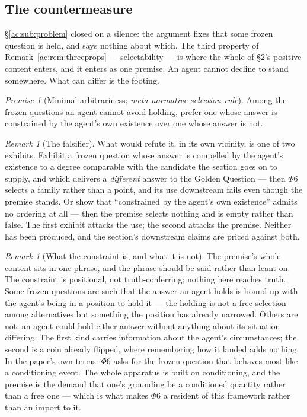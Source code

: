 \documentclass[11pt]{article}
\numberwithin{equation}{section}
\theoremstyle{plain}
\theoremstyle{definition}
\theoremstyle{remark}
\newtheorem{remark}[theorem]{Remark}
\newtheorem{premise}{Premise}
\begin{document}
\subsection{The countermeasure}\label{ac:sub:countermeasure}

\S\ref{ac:sub:problem} closed on a silence: the argument fixes that some frozen question is held, and says nothing about which. The third property of Remark~\ref{ac:rem:threeprops} --- selectability --- is where the whole of \S2's positive content enters, and it enters as one premise. An agent cannot decline to stand somewhere. What can differ is the footing.

\setcounter{premise}{5} %
\begin{premise}[Minimal arbitrariness; \emph{meta-normative selection rule}]\label{ac:phi6}
Among the frozen questions an agent cannot avoid holding, prefer one whose answer is constrained by the agent's own existence over one whose answer is not.
\end{premise}

\begin{remark}[The falsifier]\label{ac:rem:phi6falsifier}
What would refute it, in its own vicinity, is one of two exhibits. Exhibit a frozen question whose answer is compelled by the agent's existence to a degree comparable with the candidate the section goes on to supply, and which delivers a \emph{different} answer to the Golden Question --- then $\Phi6$ selects a family rather than a point, and its use downstream fails even though the premise stands. Or show that ``constrained by the agent's own existence'' admits no ordering at all --- then the premise selects nothing and is empty rather than false. The first exhibit attacks the use; the second attacks the premise. Neither has been produced, and the section's downstream claims are priced against both.
\end{remark}

\begin{remark}[What the constraint is, and what it is not]\label{ac:rem:constraint}
The premise's whole content sits in one phrase, and the phrase should be said rather than leant on. The constraint is positional, not truth-conferring; nothing here reaches truth. Some frozen questions are such that the answer an agent holds is bound up with the agent's being in a position to hold it --- the holding is not a free selection among alternatives but something the position has already narrowed. Others are not: an agent could hold either answer without anything about its situation differing. The first kind carries information about the agent's circumstances; the second is a coin already flipped, where remembering how it landed adds nothing. In the paper's own terms: $\Phi6$ asks for the frozen question that behaves most like a conditioning event. The whole apparatus is built on conditioning, and the premise is the demand that one's grounding be a conditioned quantity rather than a free one --- which is what makes $\Phi6$ a resident of this framework rather than an import to it.
\end{remark}
\end{document}

